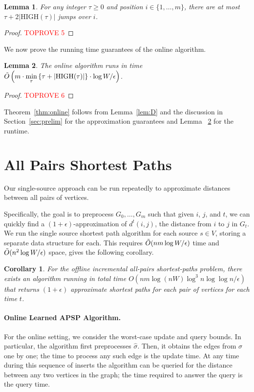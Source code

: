 \documentclass[11pt]{article}
\newtheorem{lemma}{Lemma}
\newtheorem{corollary}{Corollary}
\begin{document}
\begin{lemma}
\label{lem:jump}
    For any integer $\tau\geq 0$ and  position $i \in \{1,\ldots,m\}$, there are at most $\tau + 2|\text{HIGH}(\tau)|$ jumps over $i$.
\end{lemma}

\begin{proof}\textcolor{red}{TOPROVE 5}\end{proof}

We now prove the running time guarantees of the online algorithm.  

 \begin{lemma}\label{lem:pred_runtime}
    The online algorithm runs in time $\Tilde{O}\left(m \cdot \min\limits_{\tau} \left\{\tau + |\text{HIGH}(\tau)|\right\}\cdot \log W / \epsilon \right)$.
\end{lemma}

\begin{proof}\textcolor{red}{TOPROVE 6}\end{proof}

Theorem~\ref{thm:online} follows from  Lemma~\ref{lem:D} and the discussion in Section~\ref{sec:prelim} for the approximation guarantees and Lemma ~\ref{lem:pred_runtime} for the runtime. \section{All Pairs Shortest Paths}

Our single-source  approach can be run repeatedly to approximate distances between all pairs of vertices.

Specifically, the goal is to preprocess $G_0, \ldots, G_m$ such that given $i$, $j$, and $t$, we can quickly find a $(1 + \epsilon)$-approximation of $d^t(i,j)$, the distance from $i$ to $j$ in $G_t$.  
We run the single source shortest path algorithm for each source $s\in V$, storing a separate data structure for each.  
This requires $\Tilde{O}(nm\log W/\epsilon)$ time and $\Tilde{O}(n^2 \log W / \epsilon)$ space, gives the following corollary.


\begin{corollary}
\label{cor:offline-approx-apsp}
    For the offline incremental all-pairs shortest-paths problem, there exists an algorithm running in total time $ O(nm\log(nW)\log^3 n \log\log n/\epsilon)$ that returns $(1+\epsilon)$ approximate shortest paths for each pair of vertices for each time $t$. 
\end{corollary}

\paragraph{Online Learned APSP Algorithm.}  
For the online setting, we consider the worst-case update and query bounds.  In particular, the algorithm first preprocesses $\hat{\sigma}$.  Then, it obtains the edges from $\sigma$ one by one; the time to process any such edge is the update time.  At any time during this sequence of inserts the algorithm can be queried for the distance between any two vertices in the graph; the time required to answer the query is the query time.
\end{document}
